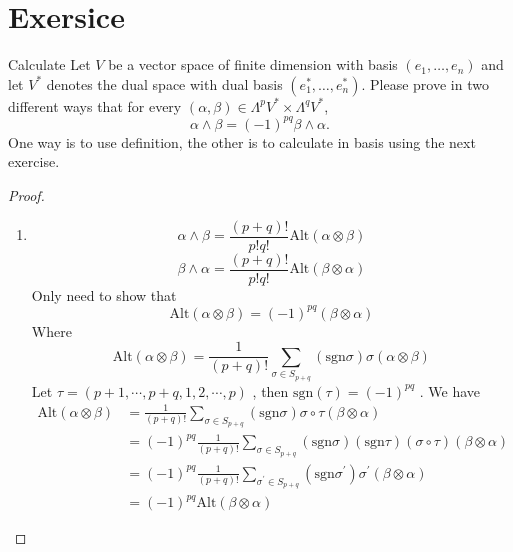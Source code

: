 \documentclass[../main.tex]{subfiles}
\begin{document}
\section{Exersice}


\begin{exercise}{Calculate}{}
Let $V$ be a vector space of finite dimension with basis $(e_1, \dots, e_n)$ and let $V^*$ denotes the dual space with dual basis $(e_1^*, \dots, e_n^*)$. Please prove in two different ways that for every $(\alpha, \beta) \in \Lambda^p V^* \times \Lambda^q V^*$,
\[
\alpha \wedge \beta = (-1)^{pq} \beta \wedge \alpha.
\]
One way is to use definition, the other is to calculate in basis using the next exercise.
\end{exercise}

\begin{proof}
   \begin{enumerate}
    \item   \[
     \alpha \wedge \beta = \frac{\left( p+ q \right)!  }{ p!q!} \mathrm{Alt}\left( \alpha \otimes \beta  \right) 
     \] \[
     \beta \wedge \alpha =  \frac{\left( p+ q \right)!  }{p!q! } \mathrm{Alt}\left( \beta \otimes \alpha  \right)  
     \]Only need to show that \[
     \mathrm{Alt}\left( \alpha \otimes \beta  \right)= \left( -1 \right)^{pq} \left( \beta \otimes \alpha  \right)   
     \] Where \[
     \mathrm{Alt}\left( \alpha \otimes \beta  \right)= \frac{1 }{\left( p+ q \right)!  }\sum _{ \sigma \in  S_{p+ q}} \left( \mathrm{sgn} \sigma  \right)    \sigma \left(  \alpha \otimes \beta  \right) 
     \]Let \(  \tau = \left( p+ 1,\cdots ,p+ q, 1,2,\cdots ,p \right)   \) , then \(  \mathrm{sgn}\left( \tau  \right)= \left( -1 \right)^{pq}    \)   . We have \[
    \begin{aligned}
     \mathrm{Alt}\left( \alpha \otimes \beta  \right)&=  \frac{1 }{\left( p+ q \right)!  } \sum _{ \sigma \in S_{p+ q}}\left( \mathrm{sgn} \sigma  \right)  \sigma\circ  \tau \left( \beta \otimes \alpha  \right)     \\ 
      &= \left( -1 \right)^{pq}\frac{1 }{\left( p+ q \right)!  } \sum _{ \sigma \in S_{p+ q}} \left( \mathrm{sgn} \sigma  \right)\left( \mathrm{sgn}\tau  \right) \left(  \sigma \circ \tau  \right)\left( \beta \otimes \alpha  \right)\\ 
       &= \left( -1 \right)^{pq}\frac{1 }{\left( p+ q \right)!  }  \sum _{  \sigma ^{\prime} \in S_{p+ q}} \left( \mathrm{sgn} \sigma ^{\prime}  \right)  \sigma ^{\prime} \left( \beta \otimes \alpha  \right)\\ 
        &= \left( -1 \right)^{pq} \mathrm{Alt}\left( \beta \otimes \alpha  \right)            

\end{aligned}\]
\end{enumerate}
\end{proof}
\end{document}
